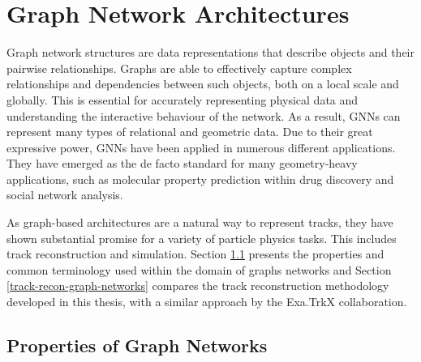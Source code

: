 

\section{Graph Network Architectures}
\label{graph-networks}

Graph network structures are data representations that describe objects and their pairwise relationships. Graphs are able to effectively capture complex relationships and dependencies between such objects, both on a local scale and globally. This is essential for accurately representing physical data and understanding the interactive behaviour of the network. As a result, GNNs can represent many types of relational and geometric data. Due to their great expressive power, GNNs have been applied in numerous different applications. They have emerged as the de facto standard for many geometry-heavy applications, such as molecular property prediction within drug discovery and social network analysis.

As graph-based architectures are a natural way to represent tracks, they have shown substantial promise for a variety of particle physics tasks. This includes track reconstruction and simulation. Section \ref{properties-graph-networks} presents the properties and common terminology used within the domain of graphs networks and Section \ref{track-recon-graph-networks} compares the track reconstruction methodology developed in this thesis, with a similar approach by the Exa.TrkX collaboration.




\subsection{Properties of Graph Networks}
\label{properties-graph-networks}

